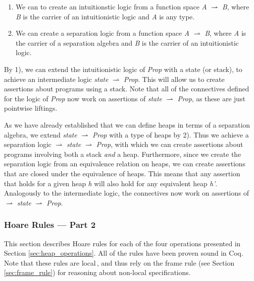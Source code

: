 \begin{enumerate}[label=\arabic*)]
\item We can to create an intuitionstic logic from a function space {\it A} $\rightharpoonup$ {\it B}, where {\it B} is the carrier of an intuitionistic logic and {\it A} is any type.
\item We can create a separation logic from a function space {\it A} $\rightharpoonup$ {\it B}, where {\it A} is the carrier of a separation algebra and {\it B} is the carrier of an intuitionistic logic.\,\cite{JBSlides}
\end{enumerate} 

By 1), we can extend the intuitionistic logic of {\it Prop} with a state (or stack), to achieve an intermediate logic {\it state} $\rightharpoonup$ {\it Prop}. This will allow us to create assertions about programs using a stack. Note that all of the connectives defined for the logic of {\it Prop} now work on assertions of {\it state} $\rightharpoonup$ {\it Prop}, as these are just pointwise liftings.

As we have already established that we can define heaps in terms of a separation algebra, we extend {\it state} $\rightharpoonup$ {\it Prop} with a type of heaps by 2). Thus we achieve a separation logic \heap $\rightharpoonup$ {\it state} $\rightharpoonup$ {\it Prop}, with which we can create assertions about programs involving both a stack {\it and} a heap. Furthermore, since we create the separation logic from an equivalence relation on heaps, we can create assertions that are closed under the equivalence of heaps. This means that any assertion that holds for a given heap {\it h} will also hold for any equivalent heap {\it h'}. Analogously to the intermediate logic, the connectives now work on assertions of \heap $\rightharpoonup$ {\it state} $\rightharpoonup$ {\it Prop}.

\subsubsection{Hoare Rules --- Part 2}
\label{sec:hoare_rules_heap}
\label{sec:heap_operations}
This section describes Hoare rules for each of the four operations presented in Section \ref{sec:heap_operations}. All of the rules have been proven sound in Coq. Note that these rules are local\,\cite{Reynolds02}, and thus rely on the frame rule (see Section \ref{sec:frame_rule}) for reasoning about non-local specifications.
